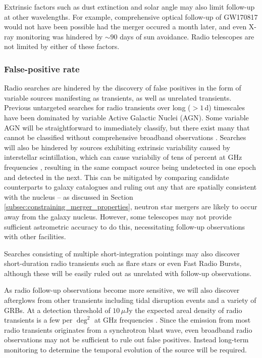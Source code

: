 \pagebreak
Extrinsic factors such as dust extinction and solar angle may also limit follow-up at other wavelengths. For example, comprehensive optical follow-up of GW170817 would not have been possible had the merger occured a month later, and even X-ray monitoring was hindered by $\sim 90$ days of sun avoidance. Radio telescopes are not limited by either of these factors.
\vspace{-6pt}
\subsubsection{False-positive rate}
\label{subsec:false_positives}
\vspace{-6pt}
Radio searches are hindered by the discovery of false positives in the form of variable sources manifesting as transients, as well as unrelated transients. Previous untargeted searches for radio transients over long ($>1\,$d) timescales \citep[][O'Brien et al. in prep., Stewart et al. in prep.]{2013ApJ...768..165M,2016ApJ...818..105M}have been dominated by variable Active Galactic Nuclei (AGN). Some variable AGN will be straightforward to immediately classify, but there exist many that cannot be classified without comprehensive broadband observations \citep[e.g.][]{2006MNRAS.371..898S,2008ApJ...689..108L,2020arXiv200504734N}. Searches will also be hindered by sources exhibiting extrinsic variability caused by interstellar scintillation, which can cause variabiliy of tens of percent at GHz frequencies \citep{2002astro.ph..7156C}, resulting in the same compact source being undetected in one epoch and detected in the next. This can be mitigated by comparing candidate counterparts to galaxy catalogues and ruling out any that are spatially consistent with the nucleus -- as discussed in Section \ref{subsec:constraining_merger_properties}, neutron star mergers are likely to occur away from the galaxy nucleus. However, some telescopes may not provide sufficient astrometric accuracy to do this, necessitating follow-up observations with other facilities.

Searches consisting of multiple short-integration pointings may also discover short-duration radio transients such as flare stars \citep[][Pritchard et al. in prep.]{1999AJ....117.1568H,2019ApJ...871..214V} or even Fast Radio Bursts, although these will be easily ruled out as unrelated with follow-up observations.

As radio follow-up observations become more sensitive, we will also discover afterglows from other transients including tidal disruption events and a variety of GRBs. At a detection threshold of $10\,\mu$Jy the expected areal density of radio transients is a few per $\deg^2$ at GHz frequencies \citep{2015ApJ...806..224M}. Since the emission from most radio transients originates from a synchrotron blast wave, even broadband radio observations may not be sufficient to rule out false positives. Instead long-term monitoring to determine the temporal evolution of the source will be required.

